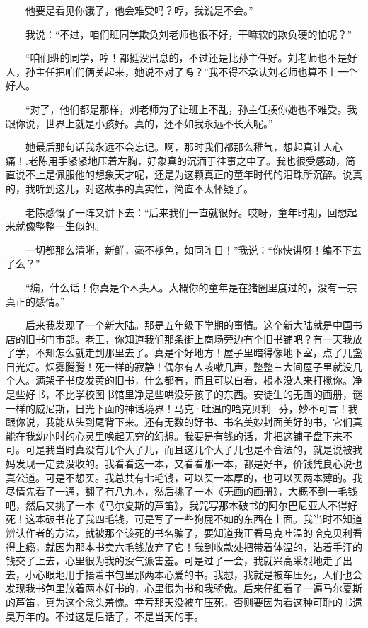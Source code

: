  　　他要是看见你饿了，他会难受吗？哼，我说是不会。” 
 
 　　我说：“不过，咱们班同学欺负刘老师也很不好，干嘛软的欺负硬的怕呢？” 
 
 　　“咱们班的同学，哼！都挺没出息的，不过还是比孙主任好。刘老师也不是好人，孙主任把咱们俩关起来，她说不对了吗？”我不得不承认刘老师也算不上一个好人。 
 
 　　“对了，他们都是那样，刘老师为了让班上不乱，孙主任揍你她也不难受。我跟你说，世界上就是小孩好。真的，还不如我永远不长大呢。” 
 
 　　她最后那句话我永远不会忘记。啊，那时我们都那么稚气，想起真让人心痛！.老陈用手紧紧地压着左胸，好象真的沉湎于往事之中了。我也很受感动，简直说不上是佩服他的想象天才呢，还是为这颗真正的童年时代的泪珠所沉醉。说真的，我听到这儿，对这故事的真实性，简直不太怀疑了。 
 
 　　老陈感慨了一阵又讲下去：“后来我们一直就很好。哎呀，童年时期，回想起来就像整整一生似的。 
 
 　　一切都那么清晰，新鲜，毫不褪色，如同昨日！”我说：“你快讲呀！编不下去了么？” 
 
 　　“编，什么话！你真是个木头人。大概你的童年是在猪圈里度过的，没有一宗真正的感情。” 
 
 　　后来我发现了一个新大陆。那是五年级下学期的事情。这个新大陆就是中国书店的旧书门市部。老王，你知道我们那条街上商场旁边有个旧书铺吧？有一天我放了学，不知怎么就走到那里去了。真是个好地方！屋子里暗得像地下室，点了几盏日光灯。烟雾腾腾！死一样的寂静！偶尔有人咳嗽几声，整整三大间屋子里就没几个人。满架子书皮发黄的旧书，什么都有，而且可以白看，根本没人来打搅你。净是些好书，不比学校图书馆里净是些哄没牙孩子的东西。安徒生的无画的画册，谜一样的威尼斯，日光下面的神话境界！马克·吐温的哈克贝利·芬，妙不可言！我跟你说，我能从头到尾背下来。还有无数的好书、书名美妙封面美好的书，它们真能在我幼小时的心灵里唤起无穷的幻想。我要是有钱的话，非把这铺子盘下来不可。可是我当时真没有几个大子儿，而且这几个大子儿也是不合法的，就是说被我妈发现一定要没收的。我看看这一本，又看看那一本，都是好书，价钱凭良心说也真公道。可是不想买。我总共有七毛钱，可以买一本厚的，也可以买两本薄的。我尽情先看了一通，翻了有八九本，然后挑了一本《无画的画册》，大概不到一毛钱吧，然后又挑了一本《马尔夏斯的芦笛》，我咒写那本破书的阿尔巴尼亚人不得好死！这本破书花了我四毛钱，可是写了一些狗屁不如的东西在上面。我当时不知道辨认作者的方法，就被那个该死的书名骗了，要知道我正看马克吐温的哈克贝利看得上瘾，就因为那本书卖六毛钱放弃了它！我到收款处把带着体温的，沾着手汗的钱交了上去，心里很为我的没气派害羞。可是过了一会，我就兴高采烈地走了出去，小心眼地用手捂着书包里那两本心爱的书。我想，我就是被车压死，人们也会发现我书包里放着两本好书的，心里很为书和我骄傲。后来仔细看了一遍马尔夏斯的芦笛，真为这个念头羞愧。幸亏那天没被车压死，否则要因为看这种可耻的书遗臭万年的。不过这是后话了，不是当天的事。 
 
